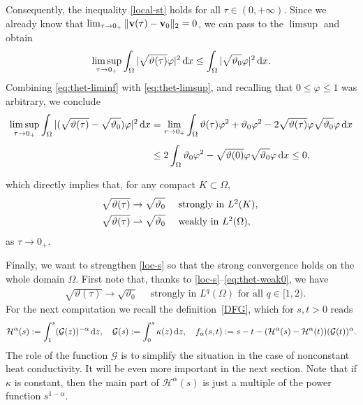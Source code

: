 \documentclass[11pt, a4paper, reqno]{amsart}
\numberwithin{equation}{section}
\newcommand{\vc}[1]{{\bf #1}}
\newcommand{\vv}{\vc{v}}
\newcommand{\thet}{\vartheta}
\newcommand{\dx}{\,{\rm d} {x}}
\newcommand{\G}{\mathcal{G}}
\newcommand{\al}{\alpha}
\newcommand{\intO}[1]{\int_{\Omega} #1 \dx}
\newcommand{\ff}{f}
\newcommand{\nm}[1]{\|#1\|}
\begin{document}
Consequently, the inequality \eqref{local-st} holds for all $\tau \in (0,+\infty)$.  
Since we already know that $\lim_{\tau\to 0_+}\nm{\vv(\tau)-\vv_0}_2=0$, we can pass to the $\limsup$ and obtain
\begin{equation}\label{eq:thet-limsup}
  \limsup_{\tau\to 0_+}\intO{|\sqrt{\thet(\tau)}\varphi|^2}\leq\intO{|\sqrt{\thet_0}\varphi|^2}.
\end{equation}
Combining \eqref{eq:thet-liminf} with \eqref{eq:thet-limsup}, and recalling that $0\le \varphi\le 1$ was arbitrary, we conclude
$$
\begin{aligned}
\limsup_{\tau \to 0_+} \intO{|(\sqrt{\thet(\tau)} - \sqrt{\thet_0})\varphi |^2}
&=\lim_{\tau \to 0_+} \intO{\thet(\tau)\varphi^2 + \thet_0 \varphi^2 - 2\sqrt{\thet(\tau)}\varphi\sqrt{\thet_0}\varphi} \\[0.3em]
&\le 2\intO{\thet_0 \varphi^2 - \sqrt{\thet(0)}\varphi\sqrt{\thet_0}\varphi}\le 0,
\end{aligned}
$$

which directly implies that, for any compact $K \subset \Omega$,  
\begin{align}
&\sqrt{\thet(\tau)}\to\sqrt{\thet_0}\quad\mbox{ strongly in $L^2(K)$, \label{loc-s}}\\
&\sqrt{\thet(\tau)}\rightharpoonup\sqrt{\thet_0}\quad\mbox{ weakly in $L^2(\Omega)$}, \label{eq:thet-weak0}
\end{align}
as $\tau\to 0_+$.


Finally, we want to strengthen \eqref{loc-s} so that the strong convergence holds on the whole domain $\Omega$. First note that, thanks to \eqref{loc-s}--\eqref{eq:thet-weak0}, we have 
\begin{align}
&\sqrt{\thet(\tau)}\to\sqrt{\thet_0}\quad \textrm{ strongly in } L^q(\Omega)  \textrm{ for all } q\in [1,2). \label{glob-s}
\end{align}
For the next computation we recall the definition~\eqref{DFG}, which for $s,t>0$ reads
\begin{equation}
\mathcal{H}^\al(s):= \int_1^s (\G(z))^{-\al}\,{\rm d}z,\quad 
\G(s):=\int_0^s \kappa(z)\, {\rm d} z,\quad 
\ff_\alpha(s,t):=s-t - (\mathcal{H}^\al(s) - \mathcal{H}^\al(t))(\G(t))^{\al}.
\end{equation}
The role of the function $\G$ is to simplify the situation in the case of nonconstant heat conductivity. 
It will be even more important in the next section. 
Note that if $\kappa$ is constant, then the main part of $\mathcal{H}^\al(s)$ is just a multiple of the power function $s^{1-\alpha}$.
\end{document}
